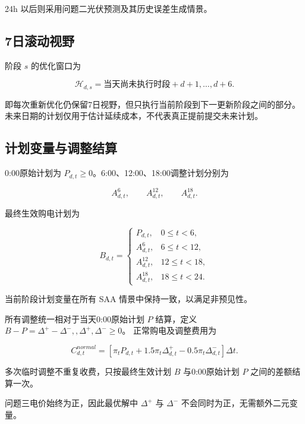 24h 以后则采用问题二光伏预测及其历史误差生成情景。

\subsection{7日滚动视野}

阶段 \(s\) 的优化窗口为

\begin{equation}
\mathcal H_{d,s}
=
\text{当天尚未执行时段}
+
d+1,\ldots,d+6.
\end{equation}

即每次重新优化仍保留7日视野，但只执行当前阶段到下一更新阶段之间的部分。未来日期的计划仅用于估计延续成本，不代表真正提前提交未来计划。

\subsection{计划变量与调整结算}

0:00原始计划为 \(P_{d,t}\ge0\)。6:00、12:00、18:00调整计划分别为

\begin{equation}
A^6_{d,t},
\qquad
A^{12}_{d,t},
\qquad
A^{18}_{d,t}.
\end{equation}

最终生效购电计划为

\begin{equation}
B_{d,t}
=
\begin{cases}
P_{d,t},&0\le t<6,\\
A^6_{d,t},&6\le t<12,\\
A^{12}_{d,t},&12\le t<18,\\
A^{18}_{d,t},&18\le t<24.
\end{cases}
\end{equation}

当前阶段计划变量在所有 SAA 情景中保持一致，以满足非预见性。

所有调整统一相对于当天0:00原始计划 \(P\) 结算，定义 \(B-P=\Delta^+-\Delta^-,, \Delta^+,\Delta^-\ge0\)。 正常购电及调整费用为

\begin{equation}
C^{normal}_{d,t}
=
\left[
\pi_tP_{d,t}
+
1.5\pi_t\Delta^+_{d,t}
-
0.5\pi_t\Delta^-_{d,t}
\right]\Delta t.
\end{equation}

多次临时调整不重复收费，只按最终生效计划 \(B\) 与0:00原始计划 \(P\) 之间的差额结算一次。

问题三电价始终为正，因此最优解中 \(\Delta^+\) 与 \(\Delta^-\) 不会同时为正，无需额外二元变量。

